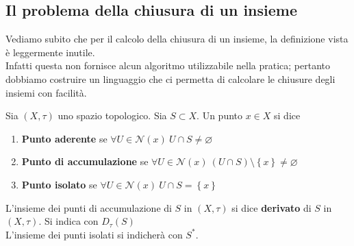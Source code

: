 \subsection{\textcolor{TopGener}{\textbf{Il problema della chiusura di un insieme}}}



Vediamo subito che per il calcolo della chiusura di un insieme, la definizione vista è leggermente inutile. \\ Infatti questa non fornisce alcun algoritmo utilizzabile nella pratica; pertanto dobbiamo costruire un linguaggio che ci permetta di calcolare le chiusure degli insiemi con facilità.
\begin{definition}
		Sia $(X, \tau)$ uno spazio topologico. Sia $S \subset X$. Un punto $x \in X$ si dice
	\begin{enumerate}
		\item \textbf{Punto aderente} se $\forall U \in \mathcal{N}(x)\ U \cap S \neq \varnothing$
		\item \textbf{Punto di accumulazione} se $\forall U \in \mathcal{N}(x)\ (U \cap S) \setminus \left\{x\right\} \neq \varnothing$
		\item \textbf{Punto isolato} se $\forall U \in \mathcal{N}(x)\ U \cap S = \left\{x\right\}$
	\end{enumerate}
\end{definition}

\begin{definition}
	L'insieme dei punti di accumulazione di $S$ in $(X,\tau)$ si dice \textbf{derivato} di $S$ in $(X, \tau)$. 
	Si indica con $D_\tau (S)$\\
	L'insieme dei punti isolati si indicherà con $S^*$.
\end{definition}

